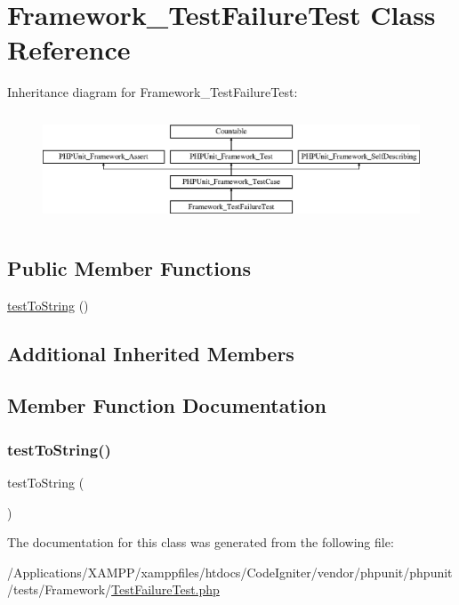 \hypertarget{class_framework___test_failure_test}{}\section{Framework\+\_\+\+Test\+Failure\+Test Class Reference}
\label{class_framework___test_failure_test}
Inheritance diagram for Framework\+\_\+\+Test\+Failure\+Test\+:\begin{figure}[H]
\begin{center}
\leavevmode
\includegraphics[height=3.303835cm]{class_framework___test_failure_test}
\end{center}
\end{figure}
\subsection*{Public Member Functions}
\begin{DoxyCompactItemize}
\item 
\mbox{\hyperlink{class_framework___test_failure_test_ad0c45cf7077d1d6d8627e47de00e0374}{test\+To\+String}} ()
\end{DoxyCompactItemize}
\subsection*{Additional Inherited Members}


\subsection{Member Function Documentation}
\mbox{\label{class_framework___test_failure_test_ad0c45cf7077d1d6d8627e47de00e0374}} 
\subsubsection{\texorpdfstring{test\+To\+String()}{testToString()}}
{\footnotesize\ttfamily test\+To\+String (\begin{DoxyParamCaption}{ }\end{DoxyParamCaption})}



The documentation for this class was generated from the following file\+:\begin{DoxyCompactItemize}
\item 
/\+Applications/\+X\+A\+M\+P\+P/xamppfiles/htdocs/\+Code\+Igniter/vendor/phpunit/phpunit/tests/\+Framework/\mbox{\hyperlink{_test_failure_test_8php}{Test\+Failure\+Test.\+php}}\end{DoxyCompactItemize}
